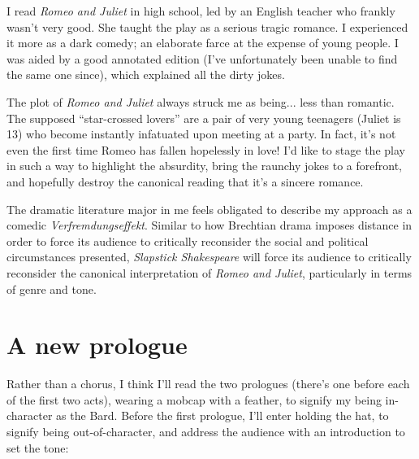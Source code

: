 \newcommand{\theplay}{\textit{Romeo and Juliet}}
\newcommand{\billy}{Shakespeare}
\newcommand{\theproduction}{\textit{Slapstick Shakespeare}}

I read \theplay{} in high school, led by an English teacher who frankly wasn't very
good. She taught the play as a serious tragic romance. I experienced it more as a dark
comedy; an elaborate farce at the expense of young people. I was aided by a good annotated
edition (I've unfortunately been unable to find the same one since), which explained all
the dirty jokes.

The plot of \theplay{} always struck me as being... less than romantic. The supposed
\enquote{star-crossed lovers} are a pair of very young teenagers (Juliet is 13) who become
instantly infatuated upon meeting at a party. In fact, it's not even the first time Romeo
has fallen hopelessly in love! I'd like to stage the play in such a way to highlight the
absurdity, bring the raunchy jokes to a forefront, and hopefully destroy the canonical
reading that it's a sincere romance.

The dramatic literature major in me feels obligated to describe my approach as a comedic
\textit{Verfremdungseffekt}. Similar to how Brechtian drama imposes distance in order to
force its audience to critically reconsider the social and political circumstances
presented, \theproduction{} will force its audience to critically reconsider the canonical
interpretation of \theplay{}, particularly in terms of genre and tone.

\section*{A new prologue}

Rather than a chorus, I think I'll read the two prologues (there's one before each of the
first two acts), wearing a mobcap with a feather, to signify my being in-character as the
Bard. Before the first prologue, I'll enter holding the hat, to signify being
out-of-character, and address the audience with an introduction to set the tone:

